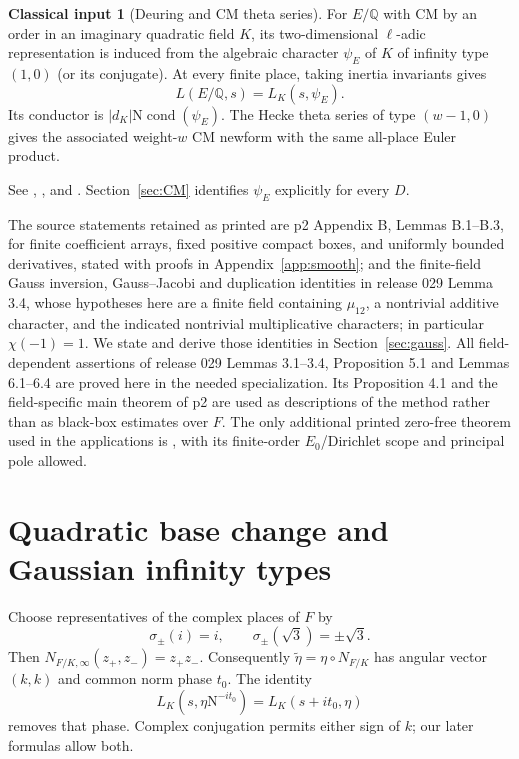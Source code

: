 \documentclass[11pt,a4paper]{article}
\numberwithin{equation}{section}
\theoremstyle{definition}
\newtheorem{inputthm}[theorem]{Classical input}
\theoremstyle{remark}
\newcommand{\Q}{\mathbb Q}
\newcommand{\N}{\mathrm N}
\begin{document}
\begin{inputthm}[Deuring and CM theta series]\label{inp:CM}
For $E/\Q$ with CM by an order in an imaginary quadratic field $K$, its two-dimensional $\ell$-adic representation is induced from the algebraic character $\psi_E$ of $K$ of infinity type $(1,0)$ (or its conjugate). At every finite place, taking inertia invariants gives
\[
 L(E/\Q,s)=L_K(s,\psi_E).
\]
Its conductor is $|d_K|\N\operatorname{cond}(\psi_E)$. The Hecke theta series of type $(w-1,0)$ gives the associated weight-$w$ CM newform with the same all-place Euler product.
\end{inputthm}
See \cite[Theorem 4.5 and the local definition following Theorem 4.4, pp.\ 26--27]{Zhang}, \cite[Chapter II, Theorem 10.5]{Silverman}, and \cite[Section 12.3]{Iwaniec}. Section~\ref{sec:CM} identifies $\psi_E$ explicitly for every $D$.

The source statements retained as printed are p2 Appendix B, Lemmas B.1--B.3, for finite coefficient arrays, fixed positive compact boxes, and uniformly bounded derivatives, stated with proofs in Appendix~\ref{app:smooth}; and the finite-field Gauss inversion, Gauss--Jacobi and duplication identities in release 029 Lemma 3.4, whose hypotheses here are a finite field containing $\mu_{12}$, a nontrivial additive character, and the indicated nontrivial multiplicative characters; in particular $\chi(-1)=1$. We state and derive those identities in Section~\ref{sec:gauss}. All field-dependent assertions of release 029 Lemmas 3.1--3.4, Proposition 5.1 and Lemmas 6.1--6.4 are proved here in the needed specialization. Its Proposition 4.1 and the field-specific main theorem of p2 are used as descriptions of the method rather than as black-box estimates over $F$. The only additional printed zero-free theorem used in the applications is \cite[Theorem 1.1]{QRH78}, with its finite-order $E_0$/Dirichlet scope and principal pole allowed.

\section{Quadratic base change and Gaussian infinity types}\label{sec:base}
Choose representatives of the complex places of $F$ by
\[
 \sigma_\pm(i)=i,\qquad \sigma_\pm(\sqrt3)=\pm\sqrt3.
\]
Then $N_{F/K,\infty}(z_+,z_-)=z_+z_-$. Consequently $\widetilde\eta=\eta\circ N_{F/K}$ has angular vector $(k,k)$ and common norm phase $t_0$. The identity
\[
 L_K(s,\eta\N^{-it_0})=L_K(s+it_0,\eta)
\]
removes that phase. Complex conjugation permits either sign of $k$; our later formulas allow both.
\end{document}
